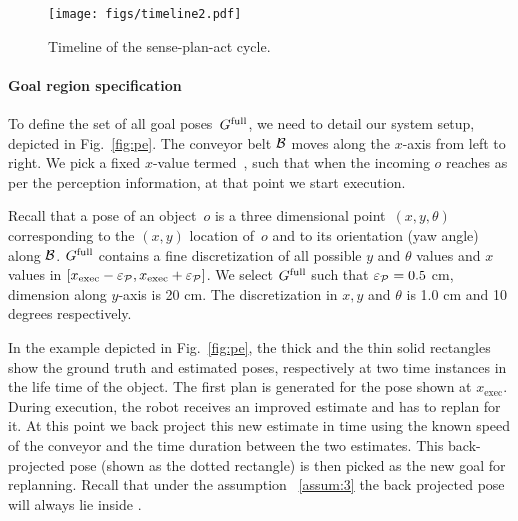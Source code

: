 \documentclass[a4paper,10pt]{article}
\begin{document}
\begin{figure}[t]
    \centering
    \texttt{[image: figs/timeline2.pdf]}
    \caption{\CaptionTextSize Timeline of the sense-plan-act cycle.}
    \label{fig:tl}
\end{figure}

\paragraph{Goal region specification}
To define the set of all goal poses~$G^{\textrm{full}}$, we need to detail our system setup, depicted in Fig.~\ref{fig:pe}.
The conveyor belt $\mathcal{B}$ moves along the $x$-axis from left to right.
We pick a fixed $x$-value termed~\Xexec, such that when the incoming $o$ reaches \Xexec as per the perception information, at that point we start execution.

%
Recall that a pose of an object~$o$ is a three dimensional point~$(x,y,\theta)$ corresponding to the $(x,y)$ location of~$o$ and to its orientation (yaw angle) along $\mathcal{B}$.
%
$G^{\textrm{full}}$ contains a fine discretization of all possible $y$ and $\theta$ values and $x$ values in  $[x_{\textrm{exec}}-\varepsilon_\mathcal{P}, x_{\textrm{exec}}+\varepsilon_\mathcal{P}]$.
We select $G^{\textrm{full}}$ such that $\varepsilon_\mathcal{P} = 0.5$ cm, dimension along $y$-axis is 20 cm. The discretization in $x,y$ and $\theta$ is 1.0 cm and 10 degrees respectively.

In the example depicted in Fig.~\ref{fig:pe}, the thick and the thin solid rectangles show the ground truth and estimated poses, respectively at two time instances in the life time of the object.
%
The first plan is generated for the pose shown at $x_{\textrm{exec}}$. During execution, the robot receives an improved estimate and has to replan for it. At this point we back project this new estimate in time using the known speed of the conveyor and the time duration between the two estimates. This back-projected pose (shown as the dotted rectangle) is then picked as the new goal for replanning. Recall that under the assumption ~\ref{assum:3} the back projected pose will always lie inside \Gfull.
%
\end{document}
